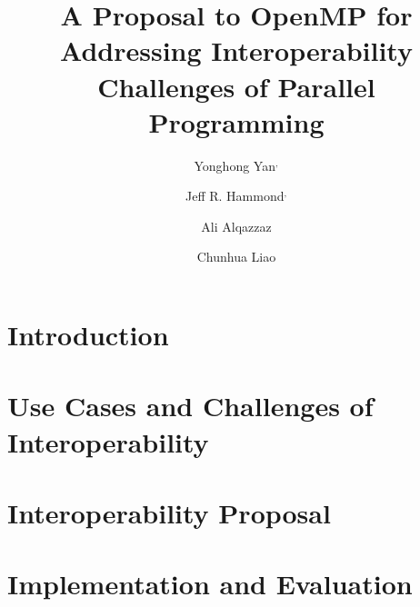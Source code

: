 \documentclass{llncs}
\begin{document}
%
\mainmatter              %
%
\title{A Proposal to OpenMP for Addressing Interoperability Challenges of Parallel Programming} %
%
\author{
	Yonghong Yan$^{,}$ \and
	Jeff R. Hammond$^{,}$ \and
	Ali Alqazzaz \and
	Chunhua Liao
}

\maketitle              %

\begin{abstract}

\end{abstract}
%

\section{Introduction}
\label{sec:intro}


\section{Use Cases and Challenges of Interoperability}
\label{sec:challenges}

\newpage

\section{Interoperability Proposal}
\label{sec:proposal}


\section{Implementation and Evaluation}
\label{sec:implementation}

\end{document}
